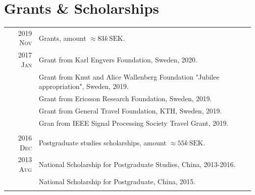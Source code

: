 \documentclass[a4paper,10pt]{article}
\begin{document}
\section{Grants \& Scholarships}
\begin{savenotes}
  \begin{longtable}{r|p{13cm}}
    \textsc{2019 Nov} & Grants, amount $\approx 83k\,\mathrm{SEK}$.\\
    \textsc{2017 Jan} & Grant from Karl Engvers Foundation, Sweden, 2020. \\

                      &  Grant from Knut and Alice Wallenberg Foundation
                        "Jubilee appropriation", Sweden, 2019. \\
                      & Grant from Ericsson Research Foundation, Sweden, 2019. \\
                      & Grant from General Travel Foundation, KTH, Sweden, 2019. \\
                      & Gran from IEEE Signal Processing Society Travel Grant, 2019. \\
    \multicolumn{2}{c}{} \\
    \textsc{2016 Dec} & Postgraduate studies scholarships, amount $\approx 55k\,\mathrm {SEK}$. \\
    \textsc{2013 Aug} & National Scholarship for Postgraduate Studies, China, 2013-2016. \\
                      & National Scholarship for Postgraduate, China, 2015.\\
    \multicolumn{2}{c}{} \\


\end{longtable}
\end{savenotes}
\end{document}
